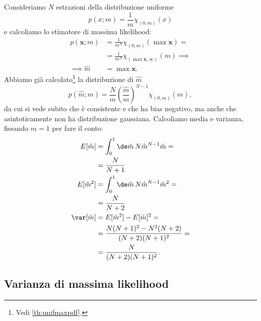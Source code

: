 \begin{example}
	Consideriamo $N$ estrazioni della distribuzione uniforme
	\begin{equation*}
		p(x;m) = \frac 1m \chi_{(0,m)}(x)
	\end{equation*}
	e calcoliamo lo stimatore di massima likelihood:
	\begin{align*}
		p(\mathbf x;m)
		&= \frac1{m^N} \chi_{(0,m)}(\max\mathbf x) = \\
		&= \frac1{m^N} \chi_{(\max\mathbf x,\infty)}(m) \implies \\
		\implies \hat m&=\max\mathbf x.
	\end{align*}
	Abbiamo già calcolato\footnote{Vedi \autoref{th:unifmaxpdf}.} la distribuzione di $\hat m$
	\begin{equation*}
		p(\hat m;m)
		= \frac Nm \left(\frac{\hat m}m\right)^{N-1} \chi_{(0,m)}(\hat m),
	\end{equation*}
	da cui si vede subito che è consistente
	e che ha bias negativo,
	ma anche che asintoticamente non ha distribuzione gaussiana.
	Calcoliamo media e varianza, fissando $m=1$ per fare il conto:
	\begin{align*}
		E[\hat m]
		&= \int_0^1 \de\hat m\, N \hat m^{N-1} \hat m = \\
		&= \frac N{N+1} \\
		E[\hat m^2]
		&= \int_0^1 \de\hat m\, N \hat m^{N-1} \hat m^2 = \\
		&= \frac N{N+2} \\
		\var[\hat m]
		&= E[\hat m^2] - E[\hat m]^2 = \\
		&= \frac{N(N+1)^2 - N^2(N+2)}{(N+2)(N+1)^2} = \\
		&= \frac N{(N+2)(N+1)^2}.
	\end{align*}
\end{example}

\subsection{Varianza di massima likelihood}

